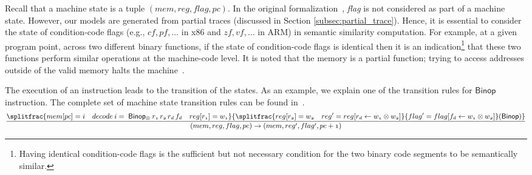 Recall that a machine state is a tuple $(mem, reg, flag, pc)$.
In the original formalization~\cite{de2015micro}, \textit{flag} is not considered as part of a machine state. However, our models are generated from partial traces (discussed in Section \ref{subsec:partial_trace}). Hence, it is essential to consider the state of condition-code flags (e.g., $cf, pf, \ldots$ in x86 and  $zf, vf, \ldots$ in ARM) in semantic similarity computation. %
For example, at a given program point, across two different binary functions, if the state of condition-code flags is identical then it is an indication\footnote{\small
Having identical condition-code flags is the sufficient but not necessary condition for the two binary code segments to be semantically similar.} %
 that these two functions perform similar operations at the machine-code level.  It is noted that the memory is a partial function; trying to access addresses outside of the valid memory halts the machine~\cite{de2015micro}.

The execution of an instruction leads to the transition of the states. As an example, we explain one of the transition  rules for $\mathsf{Binop}$ instruction. The complete set of machine state transition rules can be found in~\cite{de2015micro}.
\begin{equation*}
\small
\begin{aligned}
\mathnormal{\frac{ \splitfrac{mem[pc]=i \quad decode \: i = \; \mathsf{Binop_\otimes} \: r_1\, r_2\, r_d\,f_d \quad reg[r_1]=w_1}{\splitfrac{reg[r_2]=w_2 \quad reg^\prime = reg[r_d \leftarrow w_1 \otimes w_2]}{flag^\prime = flag[f_d \leftarrow w_1 \otimes w_2]\hfill}\hfill \mathsf{(Binop)}}}{( mem, reg, flag, pc) \rightarrow
( mem, reg^\prime, flag^\prime, pc+1)}}
\end{aligned}
\end{equation*}

